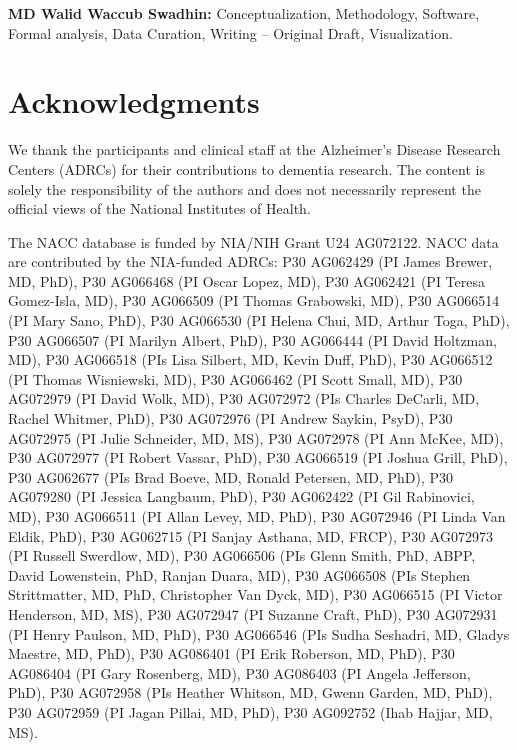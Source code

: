 \documentclass[preprint,12pt]{elsarticle}
\begin{document}
\textbf{MD Walid Waccub Swadhin:} Conceptualization, Methodology, Software, Formal analysis, Data Curation, Writing -- Original Draft, Visualization.

\section*{Acknowledgments}
We thank the participants and clinical staff at the Alzheimer's Disease Research Centers (ADRCs) for their contributions to dementia research. The content is solely the responsibility of the authors and does not necessarily represent the official views of the National Institutes of Health.

The NACC database is funded by NIA/NIH Grant U24 AG072122. NACC data are contributed by the NIA-funded ADRCs: P30 AG062429 (PI James Brewer, MD, PhD), P30 AG066468 (PI Oscar Lopez, MD), P30 AG062421 (PI Teresa Gomez-Isla, MD), P30 AG066509 (PI Thomas Grabowski, MD), P30 AG066514 (PI Mary Sano, PhD), P30 AG066530 (PI Helena Chui, MD, Arthur Toga, PhD), P30 AG066507 (PI Marilyn Albert, PhD), P30 AG066444 (PI David Holtzman, MD), P30 AG066518 (PIs Lisa Silbert, MD, Kevin Duff, PhD), P30 AG066512 (PI Thomas Wisniewski, MD), P30 AG066462 (PI Scott Small, MD), P30 AG072979 (PI David Wolk, MD), P30 AG072972 (PIs Charles DeCarli, MD, Rachel Whitmer, PhD), P30 AG072976 (PI Andrew Saykin, PsyD), P30 AG072975 (PI Julie Schneider, MD, MS), P30 AG072978 (PI Ann McKee, MD), P30 AG072977 (PI Robert Vassar, PhD), P30 AG066519 (PI Joshua Grill, PhD), P30 AG062677 (PIs Brad Boeve, MD, Ronald Petersen, MD, PhD), P30 AG079280 (PI Jessica Langbaum, PhD), P30 AG062422 (PI Gil Rabinovici, MD), P30 AG066511 (PI Allan Levey, MD, PhD), P30 AG072946 (PI Linda Van Eldik, PhD), P30 AG062715 (PI Sanjay Asthana, MD, FRCP), P30 AG072973 (PI Russell Swerdlow, MD), P30 AG066506 (PIs Glenn Smith, PhD, ABPP, David Lowenstein, PhD, Ranjan Duara, MD), P30 AG066508 (PIs Stephen Strittmatter, MD, PhD, Christopher Van Dyck, MD), P30 AG066515 (PI Victor Henderson, MD, MS), P30 AG072947 (PI Suzanne Craft, PhD), P30 AG072931 (PI Henry Paulson, MD, PhD), P30 AG066546 (PIs Sudha Seshadri, MD, Gladys Maestre, MD, PhD), P30 AG086401 (PI Erik Roberson, MD, PhD), P30 AG086404 (PI Gary Rosenberg, MD), P30 AG086403 (PI Angela Jefferson, PhD), P30 AG072958 (PIs Heather Whitson, MD, Gwenn Garden, MD, PhD), P30 AG072959 (PI Jagan Pillai, MD, PhD), P30 AG092752 (Ihab Hajjar, MD, MS).
\end{document}
